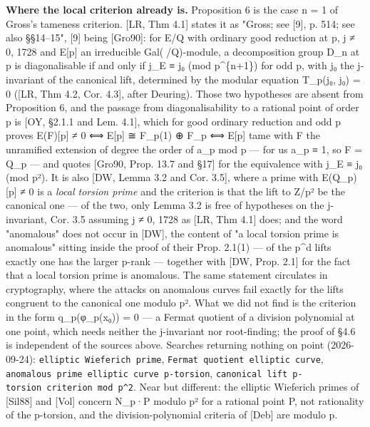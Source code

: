 \documentclass[11pt,a4paper]{article}
\theoremstyle{named}
\begin{document}
\textbf{Where the local criterion already is.} Proposition 6 is the case n = 1 of Gross's tameness criterion. [LR, Thm 4.1] states it as "Gross; see [9], p. 514; see also §§14–15", [9] being [Gro90]: for E/Q with ordinary good reduction at p, j ≠ 0, 1728 and E[p] an irreducible Gal(/Q)-module, a decomposition group D\_n at p is diagonalisable if and only if j\_E ≡ j₀ (mod p\textasciicircum{}\{n+1\}) for odd p, with j₀ the j-invariant of the canonical lift, determined by the modular equation T\_p(j₀, j₀) = 0 ([LR, Thm 4.2, Cor. 4.3], after Deuring). Those two hypotheses are absent from Proposition 6, and the passage from diagonalisability to a rational point of order p is [OY, §2.1.1 and Lem. 4.1], which for good ordinary reduction and odd p proves E(F)[p] ≠ 0 ⟺ E[p] ≅ F\_p(1) ⊕ F\_p ⟺ E[p] tame with F the unramified extension of degree the order of a\_p mod p — for us a\_p ≡ 1, so F = Q\_p — and quotes [Gro90, Prop. 13.7 and §17] for the equivalence with j\_E ≡ j₀ (mod p²). It is also [DW, Lemma 3.2 and Cor. 3.5], where a prime with E(Q\_p)[p] ≠ 0 is a \textit{local torsion prime} and the criterion is that the lift to Z/p² be the canonical one — of the two, only Lemma 3.2 is free of hypotheses on the j-invariant, Cor. 3.5 assuming j ≠ 0, 1728 as [LR, Thm 4.1] does; and the word "anomalous" does not occur in [DW], the content of "a local torsion prime is anomalous" sitting inside the proof of their Prop. 2.1(1) — of the p\textasciicircum{}d lifts exactly one has the larger p-rank — together with [DW, Prop. 2.1] for the fact that a local torsion prime is anomalous. The same statement circulates in cryptography, where the attacks on anomalous curves fail exactly for the lifts congruent to the canonical one modulo p². What we did not find is the criterion in the form q\_p(φ\_p(x₀)) = 0 — a Fermat quotient of a division polynomial at one point, which needs neither the j-invariant nor root-finding; the proof of §4.6 is independent of the sources above. Searches returning nothing on point (2026-09-24): \texttt{elliptic\ \allowbreak{}Wieferich\ \allowbreak{}prime}, \texttt{Fermat\ \allowbreak{}quotient\ \allowbreak{}elliptic\ \allowbreak{}curve}, \texttt{anomalous\ \allowbreak{}prime\ \allowbreak{}elliptic\ \allowbreak{}curve\ \allowbreak{}p-torsion}, \texttt{canonical\ \allowbreak{}lift\ \allowbreak{}p-torsion\ \allowbreak{}criterion\ \allowbreak{}mod\ \allowbreak{}p\textasciicircum{}2}. Near but different: the elliptic Wieferich primes of [Sil88] and [Vol] concern N\_p·P modulo p² for a rational point P, not rationality of the p-torsion, and the division-polynomial criteria of [Deb] are modulo p.
\end{document}
